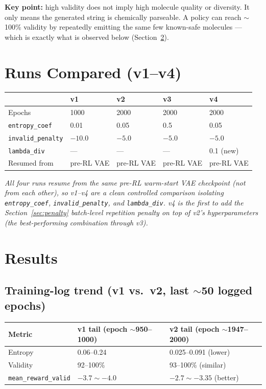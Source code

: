 \documentclass[11pt]{article}
\newcommand{\note}[1]{{\itshape\color{notegray}#1\par}}
\newcommand{\code}[1]{\texttt{#1}}
\begin{document}
\textbf{Key point:} high validity does not imply high molecule quality or diversity. It only means the generated string is chemically parseable. A policy can reach $\sim$100\% validity by repeatedly emitting the same few known-safe molecules --- which is exactly what is observed below (Section~\ref{sec:results}).

\section{Runs Compared (v1--v4)}

\begin{center}
\begin{tabular}{@{}l l l l l@{}}
\toprule
 & \textbf{v1} & \textbf{v2} & \textbf{v3} & \textbf{v4} \\
\midrule
Epochs & 1000 & 2000 & 2000 & 2000 \\
\code{entropy\_coef} & 0.01 & 0.05 & 0.5 & 0.05 \\
\code{invalid\_penalty} & $-10.0$ & $-5.0$ & $-5.0$ & $-5.0$ \\
\code{lambda\_div} & --- & --- & --- & 0.1 (new) \\
Resumed from & pre-RL VAE & pre-RL VAE & pre-RL VAE & pre-RL VAE \\
\bottomrule
\end{tabular}
\end{center}

\note{All four runs resume from the same pre-RL warm-start VAE checkpoint (not from each other), so v1--v4 are a clean controlled comparison isolating \code{entropy\_coef}, \code{invalid\_penalty}, and \code{lambda\_div}. v4 is the first to add the Section~\ref{sec:penalty} batch-level repetition penalty on top of v2's hyperparameters (the best-performing combination through v3).}

\section{Results}
\label{sec:results}

\subsection{Training-log trend (v1 vs.\ v2, last $\sim$50 logged epochs)}

\begin{center}
\begin{tabular}{@{}l l l@{}}
\toprule
\textbf{Metric} & \textbf{v1 tail (epoch $\sim$950--1000)} & \textbf{v2 tail (epoch $\sim$1947--2000)} \\
\midrule
Entropy & 0.06--0.24 & 0.025--0.091 (lower) \\
Validity & 92--100\% & 93--100\% (similar) \\
\code{mean\_reward\_valid} & $-3.7 \sim -4.0$ & $-2.7 \sim -3.35$ (better) \\
\bottomrule
\end{tabular}
\end{center}
\end{document}
